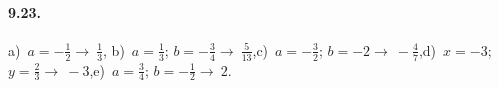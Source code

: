 \begin{multicols}{2}
\paragraph{9.23.}
a)~$a=-\frac{1}{2} \rightarrow~\frac{1}{3}$,
b)~$a=\frac{1}{3}$; $b=-\frac{3}{4} \rightarrow~\frac{5}{13}$,\quad c)~$a=-\frac{3}{2}$; $b=-2 \rightarrow~-\frac{4}{7}$,\quad d)~$x=-3$; $y=\frac{2}{3} \rightarrow~-3$,\quad e)~$a=\frac{3}{4}$; $b=-\frac{1}{2} \rightarrow~2$.
\end{multicols}
